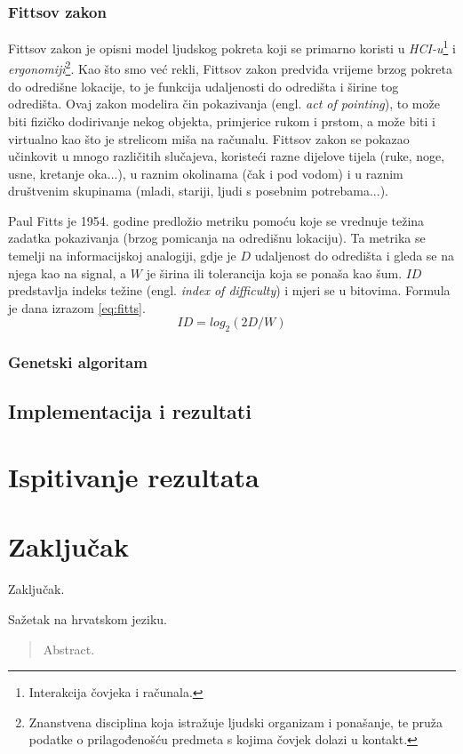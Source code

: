 \documentclass[times, utf8, zavrsni]{fer}
\begin{document}
\subsection{Fittsov zakon}
Fittsov zakon je opisni model ljudskog pokreta koji se primarno koristi u \emph{HCI-u}\footnote{Interakcija čovjeka i računala.} i \emph{ergonomiji}\footnote{Znanstvena disciplina koja istražuje ljudski organizam i ponašanje, te pruža podatke o prilagođenošću predmeta s kojima čovjek dolazi u kontakt.}. Kao što smo već rekli, Fittsov zakon predviđa vrijeme brzog pokreta do odredišne lokacije, to je funkcija udaljenosti do odredišta i širine tog odredišta. Ovaj zakon modelira čin pokazivanja (engl. \emph{act of pointing}), to može biti fizičko dodirivanje nekog objekta, primjerice rukom i prstom, a može biti i virtualno kao što je strelicom miša na računalu. Fittsov zakon se pokazao učinkovit u mnogo različitih slučajeva, koristeći razne dijelove tijela (ruke, noge, usne, kretanje oka...), u raznim okolinama (čak i pod vodom) i u raznim društvenim skupinama (mladi, stariji, ljudi s posebnim potrebama...).

Paul Fitts je 1954. godine predložio metriku pomoću koje se vrednuje težina zadatka pokazivanja (brzog pomicanja na odredišnu lokaciju). Ta metrika se temelji na informacijskoj analogiji, gdje je $D$ udaljenost do odredišta i gleda se na njega kao na signal, a $W$ je širina ili tolerancija koja se ponaša kao šum. $ID$ predstavlja indeks težine (engl. \emph{index of difficulty}) i mjeri se u bitovima. Formula je dana izrazom \ref{eq:fitts}.
\begin{equation}
\label{eq:fitts}
ID = log_2(2D/W)
\end{equation}

\subsection{Genetski algoritam}

\section{Implementacija i rezultati}

\chapter{Ispitivanje rezultata}

\chapter{Zaključak}
Zaključak.




\begin{sazetak}
Sažetak na hrvatskom jeziku.

\end{sazetak}

\begin{abstract}
Abstract.	

\end{abstract}
\end{document}

